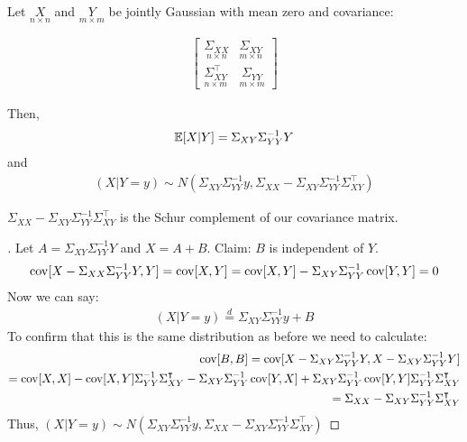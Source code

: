 \documentclass[../../../Master/AppliedStochastics.tex]{subfiles}
\begin{document}
\begin{lemma}
	Let $\underset{n\times n}{X}$ and $\underset{m\times m}{Y}$ be jointly Gaussian with mean zero and covariance: 

	$$\begin{aligned}
	\begin{bmatrix}
	\underset{n\times n}{\Sigma_{XX}} & \underset{m\times n}{\Sigma_{XY}} \\ 
	\underset{n\times m}{\Sigma_{XY}^\intercal}& \underset{m\times m}{\Sigma_{YY}}
	\end{bmatrix}
	\end{aligned}$$

Then, 
$$\begin{aligned}
	\mathbb{E}[X\vert Y] = \Sigma_{XY}\Sigma_{YY}^{-1} Y
\end{aligned}$$
and 
$$\begin{aligned}
(X\vert Y=y) \sim N(\Sigma_{XY}\Sigma_{YY}^{-1}y, \Sigma_{XX}-\Sigma_{XY}\Sigma_{YY}^{-1}\Sigma_{XY}^\intercal)
\end{aligned}$$
\begin{note}
	$\Sigma_{XX}-\Sigma_{XY}\Sigma_{YY}^{-1}\Sigma_{XY}^\intercal$ is the Schur complement of our covariance matrix.
\end{note}
\end{lemma}

\begin{proof}[]
	Let $A = \Sigma_{XY}\Sigma_{YY}^{-1}Y$ and $X = A+B$. 
	Claim: $B$ is independent of $Y$. 
		$$\begin{aligned}
		\operatorname{cov}[X-\Sigma_{XX}\Sigma_{YY}^{-1}Y,Y] = \operatorname{cov}[X,Y] 
		= \operatorname{cov}[X,Y]-\Sigma_{XY}\Sigma_{YY}^{-1}\operatorname{cov}[Y,Y]  
		= 0 
		\end{aligned}$$
	Now we can say: 
		$$\begin{aligned}
			(X\vert Y=y) \stackrel{d}{=} \Sigma_{XY}\Sigma_{YY}^{-1}y+B 
		\end{aligned}$$
	To confirm that this is the same distribution as before we need to calculate: 
		$$\begin{aligned}
		\operatorname{cov}[B,B] = \operatorname{cov}[X-\Sigma_{XY}\Sigma_{YY}^{-1}Y, X-\Sigma_{XY}\Sigma_{YY}^{-1}Y] \\
		= \operatorname{cov}[X,X] - \operatorname{cov}[X,Y]\Sigma_{YY}^{-1}\Sigma_{XY}^\intercal - \Sigma_{XY}\Sigma_{YY}^{-1}\operatorname{cov}[Y,X] + \Sigma_{XY}\Sigma_{YY}^{-1} \operatorname{cov}[Y,Y]\Sigma_{YY}^{-1}\Sigma_{XY}^\intercal \\= \Sigma_{XX}-\Sigma_{XY}\Sigma_{YY}^{-1}\Sigma_{XY}^\intercal
		\end{aligned}$$
	Thus, $(X\vert Y=y)\sim N(\Sigma_{XY}\Sigma_{YY}^{-1}y,  \Sigma_{XX}-\Sigma_{XY}\Sigma_{YY}^{-1}\Sigma_{XY}^\intercal)$
\end{proof}
\end{document}

